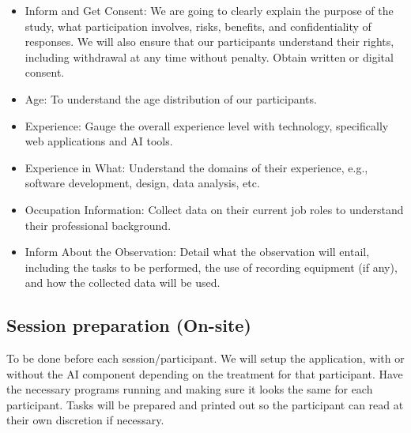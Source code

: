 \begin{itemize}
    \item Inform and Get Consent: We are going to clearly explain the purpose of the study, what participation involves, risks, benefits, and confidentiality of responses. We will also ensure that our participants understand their rights, including withdrawal at any time without penalty. Obtain written or digital consent.
\end{itemize}
\begin{itemize}
    \item Age: To understand the age distribution of our participants.
    \item Experience: Gauge the overall experience level with technology, specifically web applications and AI tools.
    \item Experience in What: Understand the domains of their experience, e.g., software development, design, data analysis, etc.
    \item Occupation Information: Collect data on their current job roles to understand their professional background.
    \item Inform About the Observation: Detail what the observation will entail, including the tasks to be performed, the use of recording equipment (if any), and how the collected data will be used.
\end{itemize}

\subsection{Session preparation (On-site)}

To be done before each session/participant. We will setup the application, with or without the AI component depending on the treatment for that participant. Have the necessary programs running and making sure it looks the same for each participant. Tasks will be prepared and printed out so the participant can read at their own discretion if necessary.